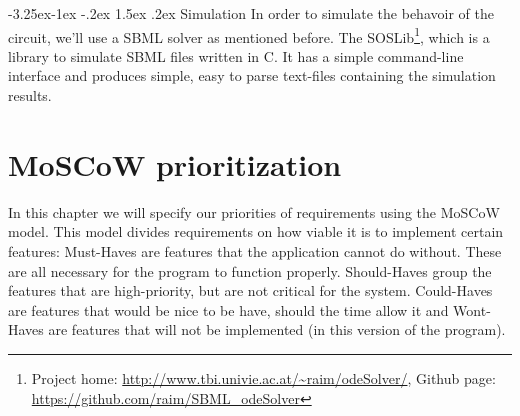 \documentclass[a4paper]{article}
\makeatletter
\renewcommand\paragraph{\@startsection{paragraph}{4}{\z@}%
  {-3.25ex\@plus -1ex \@minus -.2ex}%
  {1.5ex \@plus .2ex}%
  {\normalfont\normalsize\bfseries}}
\makeatother
\begin{document}
\paragraph{Simulation}
In order to simulate the behavoir of the circuit, we'll use a SBML solver as mentioned before. The SOSLib\footnote{ Project home: \url{http://www.tbi.univie.ac.at/~raim/odeSolver/}, Github page: \url{https://github.com/raim/SBML_odeSolver}}, which is a library to simulate SBML files written in C. It has a simple command-line interface and produces simple, easy to parse text-files containing the simulation results.



\pagebreak
\section{MoSCoW prioritization}
In this chapter we will specify our priorities of requirements using the MoSCoW model. This model divides requirements on how viable it is to implement certain features: Must-Haves are features that the application cannot do without. These are all necessary for the program to function properly. Should-Haves group the features that are high-priority, but are not critical for the system. Could-Haves are features that would be nice to be have, should the time allow it and Wont-Haves are features that will not be implemented (in this version of the program).
\end{document}
